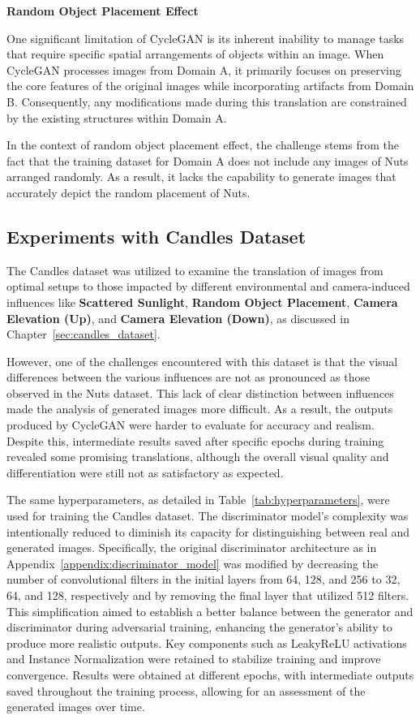 \documentclass[12pt,DIV14,BCOR12mm,a4paper,footinclude=false,headinclude,parskip=half-,twoside,openright,cleardoublepage=empty,toc=index,bibliography=totoc,listof=totoc]{scrreprt}
\numberwithin{equation}{chapter}
\begin{document}
\textbf{Random Object Placement Effect}

One significant limitation of CycleGAN is its inherent inability to manage tasks that require specific spatial arrangements of objects within an image. When CycleGAN processes images from Domain A, it primarily focuses on preserving the core features of the original images while incorporating artifacts from Domain B. Consequently, any modifications made during this translation are constrained by the existing structures within Domain A.

In the context of random object placement effect, the challenge stems from the fact that the training dataset for Domain A does not include any images of Nuts arranged randomly. As a result, it lacks the capability to generate images that accurately depict the random placement of Nuts.

\subsection{Experiments with Candles Dataset}

The Candles dataset was utilized to examine the translation of images from optimal setups to those impacted by different environmental and camera-induced influences like \textbf{Scattered Sunlight}, \textbf{Random Object Placement}, \textbf{Camera Elevation (Up)}, and \textbf{Camera Elevation (Down)}, as discussed in Chapter~\ref{sec:candles_dataset}.

However, one of the challenges encountered with this dataset is that the visual differences between the various influences are not as pronounced as those observed in the Nuts dataset. This lack of clear distinction between influences made the analysis of generated images more difficult. As a result, the outputs produced by CycleGAN were harder to evaluate for accuracy and realism. Despite this, intermediate results saved after specific epochs during training revealed some promising translations, although the overall visual quality and differentiation were still not as satisfactory as expected.

The same hyperparameters, as detailed in Table~\ref{tab:hyperparameters}, were used for training the Candles dataset. The discriminator model's complexity was intentionally reduced to diminish its capacity for distinguishing between real and generated images. Specifically, the original discriminator architecture as in Appendix~\ref{appendix:discriminator_model} was modified by decreasing the number of convolutional filters in the initial layers from 64, 128, and 256 to 32, 64, and 128, respectively and by removing the final layer that utilized 512 filters. This simplification aimed to establish a better balance between the generator and discriminator during adversarial training, enhancing the generator's ability to produce more realistic outputs. Key components such as LeakyReLU activations and Instance Normalization were retained to stabilize training and improve convergence. Results were obtained at different epochs, with intermediate outputs saved throughout the training process, allowing for an assessment of the generated images over time. 
\end{document}

